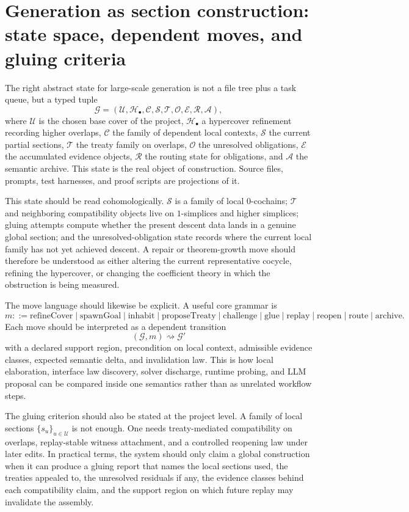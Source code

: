 \documentclass[11pt]{report}
\begin{document}
\section{Generation as section construction: state space, dependent moves, and gluing criteria}
The right abstract state for large-scale generation is not a file tree plus a task queue, but a typed tuple
\[
\mathcal{G} = (\mathcal{U}, \mathcal{H}_\bullet, \mathcal{C}, \mathcal{S}, \mathcal{T}, \mathcal{O}, \mathcal{E}, \mathcal{R}, \mathcal{A}),
\]
where $\mathcal{U}$ is the chosen base cover of the project, $\mathcal{H}_\bullet$ a hypercover refinement recording higher overlaps, $\mathcal{C}$ the family of dependent local contexts, $\mathcal{S}$ the current partial sections, $\mathcal{T}$ the treaty family on overlaps, $\mathcal{O}$ the unresolved obligations, $\mathcal{E}$ the accumulated evidence objects, $\mathcal{R}$ the routing state for obligations, and $\mathcal{A}$ the semantic archive. This state is the real object of construction. Source files, prompts, test harnesses, and proof scripts are projections of it.

This state should be read cohomologically. $\mathcal{S}$ is a family of local $0$-cochains; $\mathcal{T}$ and neighboring compatibility objects live on $1$-simplices and higher simplices; gluing attempts compute whether the present descent data lands in a genuine global section; and the unresolved-obligation state records where the current local family has not yet achieved descent. A repair or theorem-growth move should therefore be understood as either altering the current representative cocycle, refining the hypercover, or changing the coefficient theory in which the obstruction is being measured.

The move language should likewise be explicit. A useful core grammar is
\[
m ::= \mathrm{refineCover}
\mid \mathrm{spawnGoal}
\mid \mathrm{inhabit}
\mid \mathrm{proposeTreaty}
\mid \mathrm{challenge}
\mid \mathrm{glue}
\mid \mathrm{replay}
\mid \mathrm{reopen}
\mid \mathrm{route}
\mid \mathrm{archive}.
\]
Each move should be interpreted as a dependent transition
\[
(\mathcal{G}, m) \rightsquigarrow \mathcal{G}'
\]
with a declared support region, precondition on local context, admissible evidence classes, expected semantic delta, and invalidation law. This is how local elaboration, interface law discovery, solver discharge, runtime probing, and LLM proposal can be compared inside one semantics rather than as unrelated workflow steps.

The gluing criterion should also be stated at the project level. A family of local sections $\{s_u\}_{u \in \mathcal{U}}$ is not enough. One needs treaty-mediated compatibility on overlaps, replay-stable witness attachment, and a controlled reopening law under later edits. In practical terms, the system should only claim a global construction when it can produce a gluing report that names the local sections used, the treaties appealed to, the unresolved residuals if any, the evidence classes behind each compatibility claim, and the support region on which future replay may invalidate the assembly.
\end{document}
